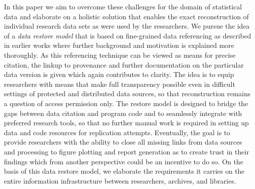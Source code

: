 \documentclass{acm_proc_article-sp}
\begin{document}
In this paper we aim to overcome these challenges for the domain of statistical data and elaborate on a holistic solution that enables the exact reconstruction of individual research data sets as were used by the researchers.
We pursue the idea of a \emph{data restore model} that is based on fine-grained data referencing as described in earlier works \cite{BahlsTochtermann_2012}
where further background and motivation is explained more thoroughly.
As this referencing technique can be viewed as means for precise citation, the linkup to provenance and further documentation on the particular data version is given which again contributes to clarity.
The idea is to equip researchers with means that make full transparency possible even in difficult settings of protected and distributed data sources, so that reconstruction remains a question of access permission only.
The restore model is designed to bridge the gaps between data citation and program code and to seamlessly integrate with preferred research tools, so that no further manual work is required in setting up data and code resources for replication attempts.
Eventually, the goal is to provide researchers with the ability to close all missing links from data sources and processing to figure plotting and report generation as to create trust in their findings which from another perspective could be an incentive to do so.
On the basis of this data restore model, we elaborate the requirements it carries on the entire information infrastructure between researchers, archives, and libraries.


\end{document}
